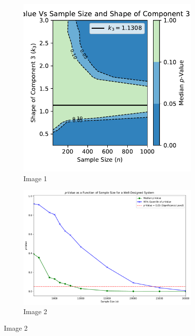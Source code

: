 \documentclass{article}
\begin{document}
\begin{figure}
    \centering
    \begin{subfigure}{0.45\textwidth}
        \includegraphics[width=\textwidth]{contour_plot.pdf}
        \caption{Image 1}
    \end{subfigure}
    \begin{subfigure}{0.45\textwidth}
        \includegraphics[width=\textwidth]{n-vs-p-value.pdf}
        \caption{Image 2}
    \end{subfigure}
\end{figure}
\end{document}
